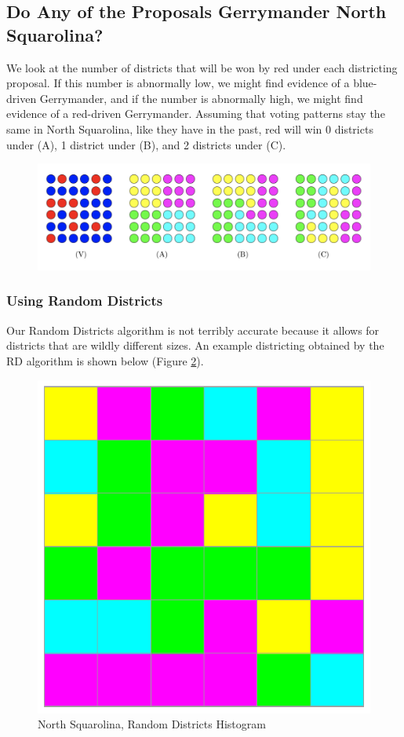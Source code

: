 \documentclass[12pt]{article}
\begin{document}
\subsection{Do Any of the Proposals Gerrymander North Squarolina?}
We look at the number of districts that will be won by red under each districting proposal. If this number is abnormally low, we might find evidence of a blue-driven Gerrymander, and if the number is abnormally high, we might find evidence of a red-driven Gerrymander.
Assuming that voting patterns stay the same in North Squarolina, like they have in the past, red will win 0 districts under (A), 1 district under (B), and 2 districts under (C).
\begin{figure}[h!]
\centering
\includegraphics[scale=0.8]{squarolina}
\label{fig:squarolina}
\end{figure}
\subsubsection{Using Random Districts}
Our Random Districts algorithm is not terribly accurate because it allows for districts that are wildly different sizes. An example districting obtained by the RD algorithm is shown below (Figure \ref{fig:rdd}).

    \begin{figure}[h!]
    \centering
    \includegraphics[scale=0.60]{rd_districting.pdf}
    \caption{North Squarolina, Random Districts Histogram}
    \label{fig:rdd}
    \end{figure}
\end{document}
